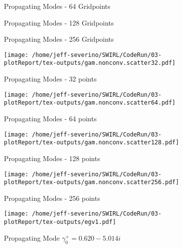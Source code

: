 \documentclass[a4paper]{article}
\begin{document}
\begin{figure}
    \centering
    
    \caption{Propagating Modes - 64 Gridpoints}
\end{figure}
\begin{figure}
    \centering
    
    \caption{Propagating Modes - 128 Gridpoints}
\end{figure}
\begin{figure}
    \centering
    
    \caption{Propagating Modes - 256 Gridpoints}
\end{figure}

 \begin{figure}
     \centering
     \texttt{[image: /home/jeff-severino/SWIRL/CodeRun/03-plotReport/tex-outputs/gam.nonconv.scatter32.pdf]}
     \caption{Propagating Modes - 32 points}
 \end{figure}

 \begin{figure}
     \centering
     \texttt{[image: /home/jeff-severino/SWIRL/CodeRun/03-plotReport/tex-outputs/gam.nonconv.scatter64.pdf]}
     \caption{Propagating Modes - 64 points}
 \end{figure}


 \begin{figure}
     \centering
     \texttt{[image: /home/jeff-severino/SWIRL/CodeRun/03-plotReport/tex-outputs/gam.nonconv.scatter128.pdf]}
     \caption{Propagating Modes - 128 points}
 \end{figure}


 \begin{figure}
     \centering
     \texttt{[image: /home/jeff-severino/SWIRL/CodeRun/03-plotReport/tex-outputs/gam.nonconv.scatter256.pdf]}
     \caption{Propagating Modes - 256 points}
 \end{figure}


 \begin{figure}
     \centering
     \texttt{[image: /home/jeff-severino/SWIRL/CodeRun/03-plotReport/tex-outputs/egv1.pdf]}
     \caption{Propagating Mode $\gamma^+_0 = 0.620-5.014i$}
 \end{figure}
\end{document}
